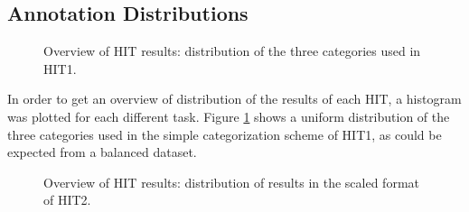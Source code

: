 \documentclass[11pt]{elsarticle}
\begin{document}
\subsection{Annotation Distributions}
\label{sect:distr}

\begin{figure}[h]
  \begin{center}
\caption{Overview of HIT results: distribution of the three categories used in HIT1.}
\label{distr1}
  \end{center}
\end{figure}

In order to get an overview of distribution of the results of each HIT, a histogram was plotted for each different task. Figure \ref{distr1} shows a uniform distribution of the three categories used in the simple categorization scheme of HIT1, as could be expected from a balanced dataset.

\begin{figure}[h]
  \begin{center}
\caption{Overview of HIT results: distribution of results in the scaled format of HIT2.}
\label{distr2}
  \end{center}
\end{figure}
\end{document}
